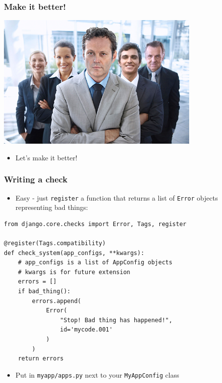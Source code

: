 \documentclass{beamer}
\begin{document}
\begin{frame}[fragile]\frametitle{Make it better!}

    \begin{center}
        \includegraphics[width=10cm]{better}
    \end{center}

    \begin{itemize}
        \item Let's make it better!
    \end{itemize}

\end{frame}


\begin{frame}[fragile]\frametitle{Writing a check}

    \begin{itemize}
        \item Easy - just \texttt{register} a function that returns a list of \texttt{Error} objects representing bad things:
    \end{itemize}

    \begin{lstlisting}
from django.core.checks import Error, Tags, register

@register(Tags.compatibility)
def check_system(app_configs, **kwargs):
    # app_configs is a list of AppConfig objects
    # kwargs is for future extension
    errors = []
    if bad_thing():
        errors.append(
            Error(
                "Stop! Bad thing has happened!",
                id='mycode.001'
            )
        )
    return errors
    \end{lstlisting}

    \begin{itemize}
        \item Put in \texttt{myapp/apps.py} next to your \texttt{MyAppConfig} class
    \end{itemize}

\end{frame}
\end{document}
